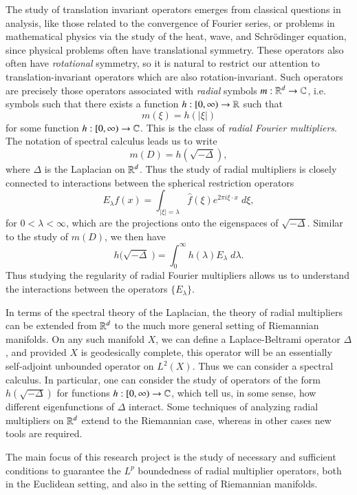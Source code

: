 The study of translation invariant operators emerges from classical questions in analysis, like those related to the convergence of Fourier series, or problems in mathematical physics via the study of the heat, wave, and Schr\"{o}dinger equation, since physical problems often have translational symmetry. These operators also often have \emph{rotational} symmetry, so it is natural to restrict our attention to translation-invariant operators which are also rotation-invariant. Such operators are precisely those operators associated with \emph{radial} symbols $m: \operatorname{\mathbb{R}}^d \to \operatorname{\mathbb{C}}$, i.e. symbols such that there exists a function $h: [0,\infty) \to \operatorname{\mathbb{R}}$ such that
%
\[ m(\xi) = h(|\xi|) \]
%
for some function $h: [0,\infty) \to \operatorname{\mathbb{C}}$. This is the class of \emph{radial Fourier multipliers}. The notation of spectral calculus leads us to write
%
\[ m(D) = h \left( \sqrt{-\Delta} \right), \]
%
where $\Delta$ is the Laplacian on $\operatorname{\mathbb{R}}^d$. Thus the study of radial multipliers is closely connected to interactions between the spherical restriction operators
%
\[ E_\lambda f(x) = \int_{|\xi| = \lambda} \widehat{f}(\xi) e^{2 \pi i \xi \cdot x}\; d\xi, \]
%
for $0 < \lambda < \infty$, which are the projections onto the eigenspaces of $\sqrt{-\Delta}$. Similar to the study of $m(D)$, we then have
%
\[ h \Big( \sqrt{-\Delta}\; \Big) = \int_0^\infty h(\lambda) E_\lambda\; d\lambda. \]
%
Thus studying the regularity of radial Fourier multipliers allows us to understand the interactions between the operators $\{ E_\lambda \}$.

In terms of the spectral theory of the Laplacian, the theory of radial multipliers can be extended from $\operatorname{\mathbb{R}}^d$ to the much more general setting of Riemannian manifolds. On any such manifold $X$, we can define a Laplace-Beltrami operator $\Delta$, and provided $X$ is geodesically complete, this operator will be an essentially self-adjoint unbounded operator on $L^2(X)$. Thus we can consider a spectral calculus. In particular, one can consider the study of operators of the form $h(\sqrt{-\Delta})$ for functions $h: [0,\infty) \to \operatorname{\mathbb{C}}$, which tell us, in some sense, how different eigenfunctions of  $\Delta$ interact. Some techniques of analyzing radial multipliers on $\operatorname{\mathbb{R}}^d$ extend to the Riemannian case, whereas in other cases new tools are required.

The main focus of this research project is the study of necessary and sufficient conditions to guarantee the $L^p$ boundedness of radial multiplier operators, both in the Euclidean setting, and also in the setting of Riemannian manifolds. %


